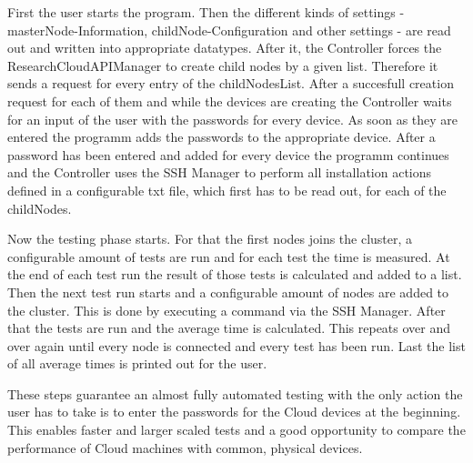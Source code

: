 First the user starts the program. Then the different kinds of settings - masterNode-Information, childNode-Configuration and other settings - are read out and written into appropriate datatypes. After it, the Controller forces the ResearchCloudAPIManager to create child nodes by a given list. Therefore it sends a request for every entry of the childNodesList. After a succesfull creation request for each of them and while the devices are creating the Controller waits for an input of the user with the passwords for every device. As soon as they are entered the programm adds the passwords to the appropriate device. After a password has been entered and added for every device the programm continues and the Controller uses the SSH Manager to perform all installation actions defined in a configurable txt file, which first has to be read out, for each of the childNodes.

Now the testing phase starts. For that the first nodes joins the cluster, a configurable amount of tests are run and for each test the time is measured. At the end of each test run the result of those tests is calculated and added to a list. Then the next test run starts and a configurable amount of nodes are added to the cluster. This is done by executing a command via the SSH Manager. After that the tests are run and the average time is calculated. This repeats over and over again until every node is connected and every test has been run. Last the list of all average times is printed out for the user.

These steps guarantee an almost fully automated testing with the only action the user has to take is to enter the passwords for the Cloud devices at the beginning. This enables faster and larger scaled tests and a good opportunity to compare the performance of Cloud machines with common, physical devices.
